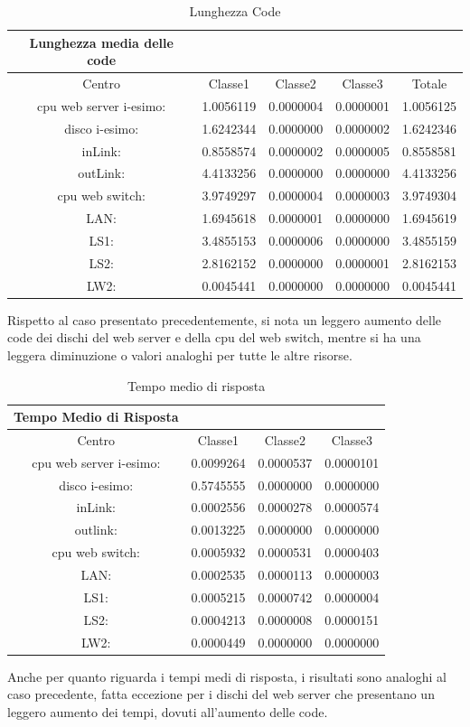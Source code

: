 \begin{table}[htbp]
\begin{center}
\begin{tabular}{|c|c|c|c|c|}
\hline
Lunghezza media delle code\\
\hline
Centro &Classe1 &Classe2 &Classe3 &Totale\\
\hline
\hline
 cpu web server i-esimo: 	&1.0056119	&0.0000004	&0.0000001	&1.0056125\\
\hline
 disco i-esimo: 	&1.6242344	&0.0000000	&0.0000002	&1.6242346\\
\hline
 inLink: 	&0.8558574	&0.0000002	&0.0000005	&0.8558581\\
\hline
 outLink: 	&4.4133256	&0.0000000	&0.0000000	&4.4133256\\
\hline
 cpu web switch: 	&3.9749297	&0.0000004	&0.0000003	&3.9749304\\
\hline
 LAN: 	&1.6945618	&0.0000001	&0.0000000	&1.6945619\\
\hline
 LS1: 	&3.4855153	&0.0000006	&0.0000000	&3.4855159\\
\hline
 LS2: 	&2.8162152	&0.0000000	&0.0000001	&2.8162153\\
\hline
 LW2: 	&0.0045441	&0.0000000	&0.0000000	&0.0045441\\
\hline
\end{tabular}
\end{center}
\caption{Lunghezza Code}
\label{lunghezzacode}
\end{table}
Rispetto al caso presentato precedentemente, si nota un leggero aumento delle code dei dischi del web server e della cpu del web switch, mentre si ha una leggera diminuzione o valori analoghi per tutte le altre risorse.
\begin{table}[htbp]
\begin{center}
\begin{tabular}{|c|c|c|c|}
\hline
Tempo Medio di Risposta\\
\hline
Centro &Classe1 &Classe2 &Classe3\\
\hline
\hline
 cpu web server i-esimo: 	&0.0099264	&0.0000537	&0.0000101\\
\hline
 disco i-esimo: 	&0.5745555	&0.0000000	&0.0000000\\
\hline
 inLink: 	&0.0002556	&0.0000278	&0.0000574\\
\hline
 outlink: 	&0.0013225	&0.0000000	&0.0000000\\
\hline
 cpu web switch: 	&0.0005932	&0.0000531	&0.0000403\\
\hline
 LAN: 	&0.0002535	&0.0000113	&0.0000003\\
\hline
 LS1: 	&0.0005215	&0.0000742	&0.0000004\\
\hline
 LS2: 	&0.0004213	&0.0000008	&0.0000151\\
\hline
 LW2: 	&0.0000449	&0.0000000	&0.0000000\\
\hline
\end{tabular}
\end{center}
\caption{Tempo medio di risposta}
\label{tempomediorisposta}
\end{table}
Anche per quanto riguarda i tempi medi di risposta, i risultati sono analoghi al caso precedente, fatta eccezione per i dischi del web server che presentano un leggero aumento dei tempi, dovuti all'aumento delle code.

